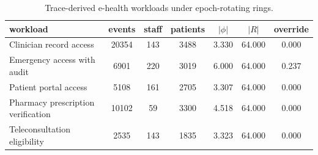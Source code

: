 \begin{table}[htbp]
\centering
\caption{Trace-derived e-health workloads under epoch-rotating rings.}
\label{tab:ehealth-workloads}
\begin{tabular}{@{}lcccccc@{}}
\toprule
workload & events & staff & patients & $|\phi|$ & $|R|$ & override \\
\midrule
Clinician record access & 20354 & 143 & 3488 & 3.330 & 64.000 & 0.000 \\
Emergency access with audit & 6901 & 220 & 3019 & 6.000 & 64.000 & 0.237 \\
Patient portal access & 5108 & 161 & 2705 & 3.307 & 64.000 & 0.000 \\
Pharmacy prescription verification & 10102 & 59 & 3300 & 4.518 & 64.000 & 0.000 \\
Teleconsultation eligibility & 2535 & 143 & 1835 & 3.323 & 64.000 & 0.000 \\
\bottomrule
\end{tabular}
\end{table}
